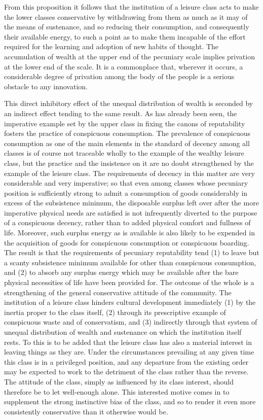 \documentclass[12pt]{report}
\begin{document}
From this proposition it follows that the institution of a leisure class
acts to make the lower classes conservative by withdrawing from them
as much as it may of the means of sustenance, and so reducing their
consumption, and consequently their available energy, to such a point
as to make them incapable of the effort required for the learning and
adoption of new habits of thought. The accumulation of wealth at the
upper end of the pecuniary scale implies privation at the lower end of
the scale. It is a commonplace that, wherever it occurs, a considerable
degree of privation among the body of the people is a serious obstacle
to any innovation.

This direct inhibitory effect of the unequal distribution of wealth
is seconded by an indirect effect tending to the same result. As has
already been seen, the imperative example set by the upper class in
fixing the canons of reputability fosters the practice of conspicuous
consumption. The prevalence of conspicuous consumption as one of the
main elements in the standard of decency among all classes is of course
not traceable wholly to the example of the wealthy leisure class, but
the practice and the insistence on it are no doubt strengthened by the
example of the leisure class. The requirements of decency in this matter
are very considerable and very imperative; so that even among classes
whose pecuniary position is sufficiently strong to admit a consumption
of goods considerably in excess of the subsistence minimum, the
disposable surplus left over after the more imperative physical
needs are satisfied is not infrequently diverted to the purpose of a
conspicuous decency, rather than to added physical comfort and fullness
of life. Moreover, such surplus energy as is available is also likely to
be expended in the acquisition of goods for conspicuous consumption or
conspicuous boarding. The result is that the requirements of pecuniary
reputability tend (1) to leave but a scanty subsistence minimum
available for other than conspicuous consumption, and (2) to absorb
any surplus energy which may be available after the bare physical
necessities of life have been provided for. The outcome of the whole is
a strengthening of the general conservative attitude of the community.
The institution of a leisure class hinders cultural development
immediately (1) by the inertia proper to the class itself, (2) through
its prescriptive example of conspicuous waste and of conservatism, and
(3) indirectly through that system of unequal distribution of wealth and
sustenance on which the institution itself rests. To this is to be added
that the leisure class has also a material interest in leaving things
as they are. Under the circumstances prevailing at any given time this
class is in a privileged position, and any departure from the existing
order may be expected to work to the detriment of the class rather than
the reverse. The attitude of the class, simply as influenced by its
class interest, should therefore be to let well-enough alone. This
interested motive comes in to supplement the strong instinctive bias of
the class, and so to render it even more consistently conservative than
it otherwise would be.
\end{document}
